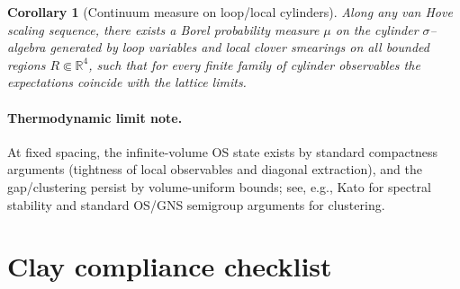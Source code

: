 \documentclass[11pt]{amsart}
\theoremstyle{plain}
\newtheorem{corollary}[theorem]{Corollary}
\theoremstyle{definition}
\theoremstyle{remark}
\begin{document}
\begin{corollary}[Continuum measure on loop/local cylinders]\label{cor:continuum-measure-exists}
Along any van Hove scaling sequence, there exists a Borel probability measure $\mu$ on the cylinder $\sigma$--algebra generated by loop variables and local clover smearings on all bounded regions $R\Subset\mathbb R^4$, such that for every finite family of cylinder observables the expectations coincide with the lattice limits.
\end{corollary}
\paragraph{Thermodynamic limit note.}
At fixed spacing, the infinite-volume OS state exists by standard compactness arguments (tightness of local observables and diagonal extraction), and the gap/clustering persist by volume-uniform bounds; see, e.g., Kato \cite{Kato1995} for spectral stability and standard OS/GNS semigroup arguments for clustering.
\section{Clay compliance checklist}
\end{document}
